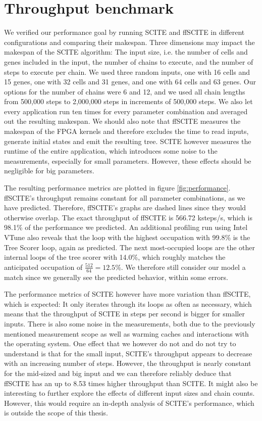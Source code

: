 \section{Throughput benchmark}

We verified our performance goal by running \ac{SCITE} and \ac{ffSCITE} in different configurations and comparing their makespan. Three dimensions may impact the makespan of the \ac{SCITE} algorithm: The input size, i.e. the number of cells and genes included in the input, the number of chains to execute, and the number of steps to execute per chain. We used three random inputs, one with 16 cells and 15 genes, one with 32 cells and 31 genes, and one with 64 cells and 63 genes. Our options for the number of chains were 6 and 12, and we used all chain lengths from 500,000 steps to 2,000,000 steps in increments of 500,000 steps. We also let every application run ten times for every parameter combination and averaged out the resulting makespan. We should also note that \ac{ffSCITE} measures the makespan of the \ac{FPGA} kernels and therefore excludes the time to read inputs, generate initial states and emit the resulting tree. \ac{SCITE} however measures the runtime of the entire application, which introduces some noise to the measurements, especially for small parameters. However, these effects should be negligible for big parameters.

The resulting performance metrics are plotted in figure \ref{fig:performance}. \ac{ffSCITE}'s throughput remains constant for all parameter combinations, as we have predicted. Therefore, \ac{ffSCITE}'s graphs are dashed lines since they would otherwise overlap. The exact throughput of \ac{ffSCITE} is 566.72 ksteps/s, which is 98.1\% of the performance we predicted. An additional profiling run using Intel VTune also reveals that the loop with the highest occupation with 99.8\% is the Tree Scorer loop, again as predicted. The next most-occupied loops are the other internal loops of the tree scorer with 14.0\%, which roughly matches the anticipated occupation of $\frac{512}{64} = 12.5\%$. We therefore still consider our model a match since we generally see the predicted behavior, within some errors.

The performance metrics of \ac{SCITE} however have more variation than \ac{ffSCITE}, which is expected: It only iterates through its loops as often as necessary, which means that the throughput of \ac{SCITE} in steps per second is bigger for smaller inputs. There is also some noise in the measurements, both due to the previously mentioned measurement scope as well as warming caches and interactions with the operating system. One effect that we however do not and do not try to understand is that for the small input, \ac{SCITE}'s throughput appears to decrease with an increasing number of steps. However, the throughput is nearly constant for the mid-sized and big input and we can therefore reliably deduce that \ac{ffSCITE} has an up to 8.53 times higher throughput than \ac{SCITE}. It might also be interesting to further explore the effects of different input sizes and chain counts. However, this would require an in-depth analysis of \ac{SCITE}'s performance, which is outside the scope of this thesis.

